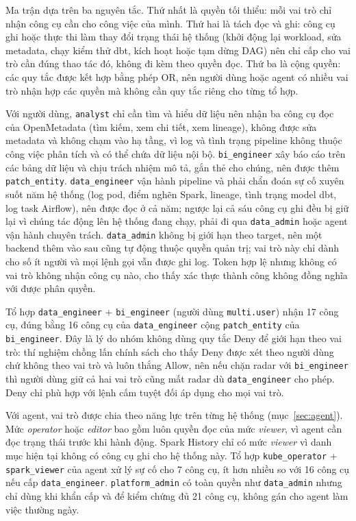 \documentclass[a4paper]{article}
\begin{document}
Ma trận dựa trên ba nguyên tắc. Thứ nhất là quyền tối thiểu: mỗi vai trò chỉ nhận công cụ cần cho công việc của mình. Thứ hai là tách đọc và ghi: công cụ ghi hoặc thực thi làm thay đổi trạng thái hệ thống (khởi động lại workload, sửa metadata, chạy kiểm thử dbt, kích hoạt hoặc tạm dừng DAG) nên chỉ cấp cho vai trò cần đúng thao tác đó, không đi kèm theo quyền đọc. Thứ ba là cộng quyền: các quy tắc được kết hợp bằng phép OR, nên người dùng hoặc agent có nhiều vai trò nhận hợp các quyền mà không cần quy tắc riêng cho từng tổ hợp.

Với người dùng, \texttt{analyst} chỉ cần tìm và hiểu dữ liệu nên nhận ba công cụ đọc của OpenMetadata (tìm kiếm, xem chi tiết, xem lineage), không được sửa metadata và không chạm vào hạ tầng, vì log và tình trạng pipeline không thuộc công việc phân tích và có thể chứa dữ liệu nội bộ. \texttt{bi\_engineer} xây báo cáo trên các bảng dữ liệu và chịu trách nhiệm mô tả, gắn thẻ cho chúng, nên được thêm \texttt{patch\_entity}. \texttt{data\_engineer} vận hành pipeline và phải chẩn đoán sự cố xuyên suốt năm hệ thống (log pod, điểm nghẽn Spark, lineage, tình trạng model dbt, log task Airflow), nên được đọc ở cả năm; ngược lại cả sáu công cụ ghi đều bị giữ lại vì chúng tác động lên hệ thống đang chạy, phải đi qua \texttt{data\_admin} hoặc agent vận hành chuyên trách. \texttt{data\_admin} không bị giới hạn theo target, nên một backend thêm vào sau cũng tự động thuộc quyền quản trị; vai trò này chỉ dành cho số ít người và mọi lệnh gọi vẫn được ghi log. Token hợp lệ nhưng không có vai trò không nhận công cụ nào, cho thấy xác thực thành công không đồng nghĩa với được phân quyền.

Tổ hợp \texttt{data\_engineer} + \texttt{bi\_engineer} (người dùng \texttt{multi.user}) nhận 17 công cụ, đúng bằng 16 công cụ của \texttt{data\_engineer} cộng \texttt{patch\_entity} của \texttt{bi\_engineer}. Đây là lý do nhóm không dùng quy tắc Deny để giới hạn theo vai trò: thí nghiệm chồng lấn chính sách cho thấy Deny được xét theo người dùng chứ không theo vai trò và luôn thắng Allow, nên nếu chặn radar với \texttt{bi\_engineer} thì người dùng giữ cả hai vai trò cũng mất radar dù \texttt{data\_engineer} cho phép. Deny chỉ phù hợp với lệnh cấm tuyệt đối áp dụng cho mọi vai trò.

Với agent, vai trò được chia theo năng lực trên từng hệ thống (mục~\ref{sec:agent}). Mức \textit{operator} hoặc \textit{editor} bao gồm luôn quyền đọc của mức \textit{viewer}, vì agent cần đọc trạng thái trước khi hành động. Spark History chỉ có mức \textit{viewer} vì danh mục hiện tại không có công cụ ghi cho hệ thống này. Tổ hợp \texttt{kube\_operator} + \texttt{spark\_viewer} của agent xử lý sự cố cho 7 công cụ, ít hơn nhiều so với 16 công cụ nếu cấp \texttt{data\_engineer}. \texttt{platform\_admin} có toàn quyền như \texttt{data\_admin} nhưng chỉ dùng khi khẩn cấp và để kiểm chứng đủ 21 công cụ, không gán cho agent làm việc thường ngày.
\end{document}
